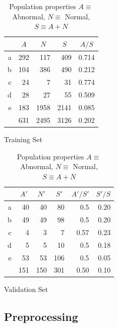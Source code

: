 \documentclass{project-logbook}
\begin{document}
{\begin{table}[ht]
    \centering
    \begin{subtable}{0.48\textwidth}
        \centering
        \begin{tabular}{*{5}{r}}
            {}  & \multicolumn{1}{c}{$A$} & \multicolumn{1}{c}{$N$} & \multicolumn{1}{c}{$S$} & \multicolumn{1}{c}{$A/S$} \\
            \midrule
            a & 292 & 117   & 409   & 0.714 \\
            b & 104 & 386   & 490   & 0.212 \\
            c & 24  & 7     & 31    & 0.774 \\
            d & 28  & 27    & 55    & 0.509 \\
            e & 183 & 1958  & 2141  & 0.085 \\
            \midrule
            & 631 & 2495 & 3126 & 0.202 \\
        \end{tabular}
        \caption{Training Set}
    \end{subtable}
    \begin{subtable}{0.48\textwidth}
        \centering
        \begin{tabular}{*{6}{r}}
            {}  & \multicolumn{1}{c}{$A'$} & \multicolumn{1}{c}{$N'$} & \multicolumn{1}{c}{$S'$} & \multicolumn{1}{c}{$A'/S'$} & $S'/S$ \\
            \midrule
            a & 40  & 40    & 80    & 0.5   & 0.20 \\
            b & 49  & 49    & 98    & 0.5   & 0.20 \\
            c & 4   & 3     & 7     & 0.57  & 0.23 \\
            d & 5   & 5     & 10    & 0.5   & 0.18 \\
            e & 53  & 53    & 106   & 0.5   & 0.05 \\
            \midrule
            & 151 & 150 & 301 & 0.50 & 0.10 \\
        \end{tabular}
        \caption{Validation Set}
    \end{subtable}
    
    \caption{Population properties $A \equiv$ Abnormal, $N\equiv$ Normal, $S\equiv A+N$}
    \label{tab:populations}
\end{table}

\subsection{Preprocessing} \label{sub:preprocessing}

}
\end{document}
